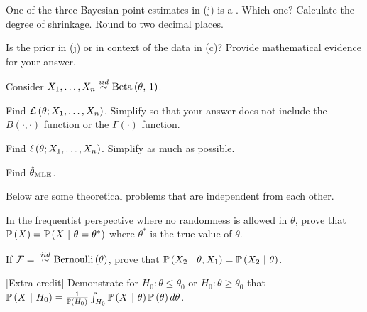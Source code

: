 \documentclass[12pt]{article}
\begin{document}
 One of the three Bayesian point estimates in (j) is a . Which one? Calculate the degree of shrinkage. Round to two decimal places. 


 Is the prior in (j)  or  in context of the data in (c)? Provide mathematical evidence for your answer. 


\eenum

\problem Consider $\Xoneton \iid \betanot{\theta}{1}$.

\benum

 Find $\mathcal{L}\left(\theta ; X_1, \ldots, X_n\right)$. Simplify so that your answer does not include the $B(\cdot,\cdot)$ function or the $\Gamma(\cdot)$ function.

 Find $\ell\left(\theta ; X_1, \ldots, X_n\right)$. Simplify as much as possible.

 Find $\hat{\theta}_{\mathrm{MLE}}$. 

\eenum

\problem Below are some theoretical problems that are independent from each other.

\benum


 In the frequentist perspective where no randomness is allowed in $\theta$, prove that $\mathbb{P}\left(X\right) = \mathbb{P}\left(X~|~\theta = \theta^*\right)$ where $\theta^*$ is the true value of $\theta$.

 If $\mathcal{F} = \iid \bernoulli{\theta}$, prove that $\mathbb{P}\left(X_2~|~\theta,X_1\right) = \mathbb{P}\left(X_2~|~\theta\right)$.


 [Extra credit] Demonstrate for $H_0 : \theta \leq \theta_0$ or $H_0 : \theta \geq \theta_0$ that $\mathbb{P}\left(X~|~H_0\right) = \frac{1}{\mathbb{P}\left(H_0\right)} \int_{H_0} \mathbb{P}\left(X~|~\theta\right) \mathbb{P}\left(\theta\right) d\theta$.

\eenum
\end{document}
